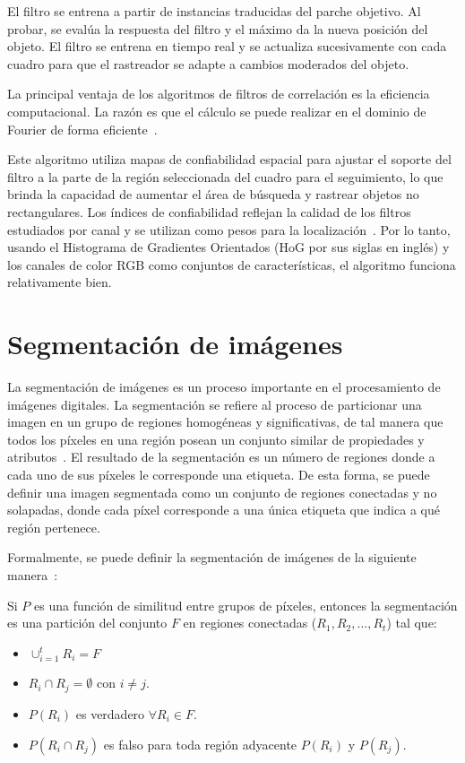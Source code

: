 El filtro se entrena a partir de instancias traducidas del parche objetivo. Al probar, se evalúa la respuesta del filtro y el máximo da la nueva posición del objeto. El filtro se entrena en tiempo real y se actualiza sucesivamente con cada cuadro para que el rastreador se adapte a cambios moderados del objeto.

La principal ventaja de los algoritmos de filtros de correlación es la eficiencia computacional. La razón es que el cálculo se puede realizar en el dominio de Fourier de forma eficiente~\cite{henriques2014high}. 

Este algoritmo utiliza mapas de confiabilidad espacial para ajustar el soporte del filtro a la parte de la región seleccionada del cuadro para el seguimiento, lo que brinda la capacidad de aumentar el área de búsqueda y rastrear objetos no rectangulares. Los índices de confiabilidad reflejan la calidad de los filtros estudiados por canal y se utilizan como pesos para la localización~\cite{lunevzivc2018discriminative}. Por lo tanto, usando el Histograma de Gradientes Orientados (HoG por sus siglas en inglés) y los canales de color RGB como conjuntos de características, el algoritmo funciona relativamente bien.


\section{Segmentación de imágenes}\label{section:seg}

La segmentación de imágenes es un proceso importante en el procesamiento de imágenes digitales. La segmentación se refiere al proceso de particionar una imagen en un grupo de regiones homogéneas y significativas, de tal manera que todos los píxeles en una región posean un conjunto similar de propiedades y atributos~\cite{sundararajan2017digital}. El resultado de la segmentación es un número de regiones donde a cada uno de sus píxeles le corresponde una etiqueta. De esta forma, se puede definir una imagen segmentada como un conjunto de regiones conectadas y no solapadas, donde cada píxel corresponde a una única etiqueta que indica a qué región pertenece.

Formalmente, se puede definir la segmentación de imágenes de la siguiente manera~\cite{pal1993review}:

\begin{definition}
	Si $P$ es una función de similitud entre grupos de píxeles, entonces la segmentación es una partición del conjunto $F$ en regiones conectadas ($R_1, R_2, \ldots, R_t$) tal que:
		\begin{itemize}
			\item $\cup_{i=1}^t R_i = F$
			\item $R_i \cap R_j = \emptyset$ con $i \neq j$.
			\item $P(R_i)$ es verdadero $\forall R_i \in F$.
			\item $P(R_i \cap R_j)$ es falso para toda región adyacente $P(R_i)$ y $P(R_j)$.
		\end{itemize}
\end{definition}

